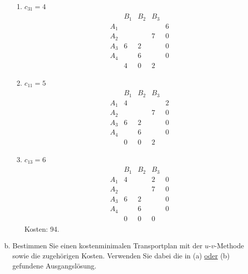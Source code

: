 \documentclass[
a4paper, %
11pt,
]
{scrartcl}
\begin{document}
\begin{enumerate}[(a)]
\begin{enumerate}[1.]
      \item $c_{31} = 4$
        \begin{align*}
          \begin{matrix}
                & B_1 & B_2 & B_3 & \\
            A_1 &     &     &     & 6\\
            A_2 &     &     & 7   & 0\\
            A_3 & 6   & 2   &     & 0\\
            A_4 &     & 6   &     & 0\\
                & 4   & 0   & 2
          \end{matrix}
        \end{align*}

      \item $c_{11} = 5$
        \begin{align*}
          \begin{matrix}
                & B_1 & B_2 & B_3 & \\
            A_1 & 4   &     &     & 2\\
            A_2 &     &     & 7   & 0\\
            A_3 & 6   & 2   &     & 0\\
            A_4 &     & 6   &     & 0\\
                & 0   & 0   & 2
          \end{matrix}
        \end{align*}

      \item $c_{13} = 6$
        \begin{align*}
          \begin{matrix}
                & B_1 & B_2 & B_3 & \\
            A_1 & 4   &     & 2   & 0\\
            A_2 &     &     & 7   & 0\\
            A_3 & 6   & 2   &     & 0\\
            A_4 &     & 6   &     & 0\\
                & 0   & 0   & 0
          \end{matrix}
        \end{align*}
        Kosten: 94.
    \end{enumerate}

  \item Bestimmen Sie einen kostenminimalen Transportplan mit der
    $u$-$v$-Methode sowie die zugehörigen Kosten. Verwenden Sie dabei die in (a)
    \underline{oder} (b) gefundene Ausgangslösung.


\end{enumerate}
\end{document}
